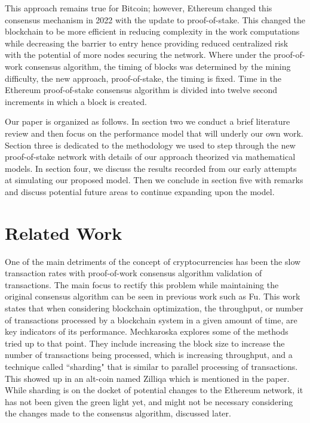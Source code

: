 \documentclass[conference]{IEEEtran}
\begin{document}
This approach remains true for Bitcoin; however, Ethereum changed this consensus 
mechanism in 2022 with the update to proof-of-stake\cite{2022_Ethereum_PoS}. This 
changed the blockchain to be more efficient in reducing complexity in the work 
computations while decreasing the barrier to entry hence providing reduced centralized 
risk with the potential of more nodes securing the network. Where under the proof-of-work
consensus algorithm, the timing of blocks was determined by the mining difficulty, the 
new approach, proof-of-stake, the timing is fixed. Time in the Ethereum proof-of-stake 
consensus algorithm is divided into twelve second increments in which a block is created.

Our paper is organized as follows. In section two we conduct a brief literature review and 
then focus on the performance model that will underly our own work. Section three is 
dedicated to the methodology we used to step through the new proof-of-stake network with details of our 
approach theorized via mathematical models. In section four, we discuss the results recorded 
from our early attempts at simulating our proposed model. Then we conclude in section five 
with remarks and discuss potential future areas to continue expanding upon the model. 

\section{Related Work}\label{related}

One of the main detriments of the concept of cryptocurrencies has been the slow transaction
rates with proof-of-work consensus algorithm validation of transactions. The main focus to rectify 
this problem while maintaining the original consensus algorithm can be seen in previous work such 
as Fu\cite{2020_IEEEToVT_Fu}. This work states that when considering blockchain optimization, 
the throughput, or number of transactions processed by a blockchain system in a given amount of 
time, are key indicators of its performance. Mechkaroska\cite{2018_TELFOR_Mechkaroska} explores
some of the methods tried up to that point. They include increasing the block size to increase the 
number of transactions being processed, which is increasing throughput, and a technique called 
``sharding" that is similar to parallel processing of transactions. This showed up in an alt-coin named 
Zilliqa\cite{2017_Zilliqa_Zilliqa} which is mentioned in the paper. While sharding is on the docket of 
potential changes to the Ethereum network, it has not been given the green light yet, and might not
be necessary considering the changes made to the consensus algorithm, discussed later.
\end{document}
